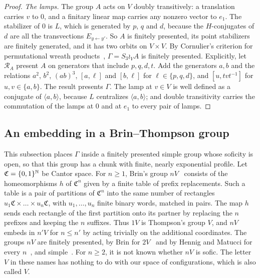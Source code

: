 \begin{proof}
\emph{The lamps.} The group $A$ acts on $V$ doubly transitively: a translation carries $v$ to $0$, and a finitary linear map carries any nonzero
vector to $e_1$. The stabilizer of $0$ is $L$, which is generated by $p$, $q$ and $d$, because the $H$-conjugates of $d$ are all the transvections
$E_{y\leftarrow y'}$. So $A$ is finitely presented, its point stabilizers are finitely generated, and it has two orbits on $V\times V$. By
Cornulier's criterion for permutational wreath products~\cite[Theorem~1.1]{Cornulier2006}, $\Gamma=S_3\wr_VA$ is finitely presented. Explicitly,
let $\mathcal R_A$ present $A$ on generators that include $p,q,d,t$. Add the generators $a,b$ and the relations $a^2$, $b^2$, $(ab)^3$, $[a,\ell]$
and $[b,\ell]$ for $\ell\in\{p,q,d\}$, and $[u,tvt^{-1}]$ for $u,v\in\{a,b\}$. The result presents $\Gamma$. The lamp at $v\in V$ is well defined
as a conjugate of $\langle a,b\rangle$, because $L$ centralizes $\langle a,b\rangle$; and double transitivity carries the commutation of the lamps
at $0$ and at $e_1$ to every pair of lamps.
\end{proof}

\subsection{An embedding in a Brin--Thompson group}\label{sec:3V}

This subsection places $\Gamma$ inside a finitely presented simple group whose soficity is open, so that this group has a chunk with finite,
nearly exponential profile. Let $\mathfrak C=\{0,1\}^{\mathbb N}$ be Cantor space. For $n\ge1$, Brin's group $nV$~\cite{Brin2004} consists of the
homeomorphisms $h$ of $\mathfrak C^n$ given by a finite table of prefix replacements. Such a table is a pair of partitions of $\mathfrak C^n$ into
the same number of rectangles $u_1\mathfrak C\times\dots\times u_n\mathfrak C$, with $u_1,\dots,u_n$ finite binary words, matched in pairs. The
map $h$ sends each rectangle of the first partition onto its partner by replacing the $n$ prefixes and keeping the $n$ suffixes. Thus $1V$ is Thompson's group
$V$, and $nV$ embeds in $n'V$ for $n\le n'$ by acting trivially on the additional coordinates. The groups $nV$ are finitely presented, by Brin for
$2V$~\cite{Brin2005} and by Hennig and Matucci for every $n$~\cite{HennigMatucci2012}, and simple~\cite{Brin2010}. For $n\ge2$, it is not known
whether $nV$ is sofic. The letter $V$ in these names has nothing to do with our space of configurations, which is also called $V$.

